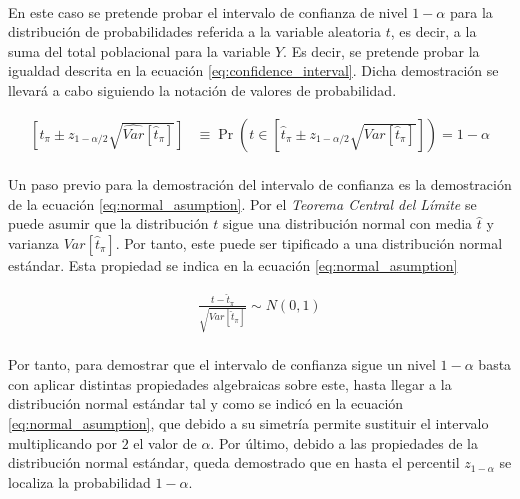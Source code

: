\documentclass{article}
\begin{document}
    \paragraph{}
    En este caso se pretende probar el intervalo de confianza de nivel $1-\alpha$ para la distribución de probabilidades referida a la variable aleatoria $t$, es decir, a la suma del total poblacional para la variable $Y$. Es decir, se pretende probar la igualdad descrita en la ecuación \eqref{eq:confidence_interval}. Dicha demostración se llevará a cabo siguiendo la notación de valores de probabilidad.

    \begin{align}
    \label{eq:confidence_interval}
      \left[\widehat{t}_\pi \pm z_{1-\alpha/2}\sqrt{\widehat{Var}[\widehat{t}_\pi]}\right] &\equiv \Pr\left(t\in \left[\widehat{t}_\pi \pm z_{1-\alpha/2}\sqrt{Var[\widehat{t}_\pi]}\right]\right) = 1-\alpha
    \end{align}

    \paragraph{}
    Un paso previo para la demostración del intervalo de confianza es la demostración de la ecuación \eqref{eq:normal_asumption}. Por el \emph{Teorema Central del Límite} se puede asumir que la distribución $t$ sigue una distribución normal con media $\widehat{t}$ y varianza $Var[\widehat{t}_\pi]$. Por tanto, este puede ser tipificado a una distribución normal estándar. Esta propiedad se indica en la ecuación \eqref{eq:normal_asumption}

    \begin{align}
    \label{eq:normal_asumption}
      \frac{t - \widehat{t}_\pi}{\sqrt{Var[\widehat{t}_\pi]}} \sim N(0,1)
    \end{align}

    \paragraph{}
    Por tanto, para demostrar que el intervalo de confianza sigue un nivel $1-\alpha$ basta con aplicar distintas propiedades algebraicas sobre este, hasta llegar a la distribución normal estándar tal y como se indicó en la ecuación \eqref{eq:normal_asumption}, que debido a su simetría permite sustituir el intervalo multiplicando por $2$ el valor de $\alpha$. Por último, debido a las propiedades de la distribución normal estándar, queda demostrado que en hasta el percentil $z_{1-\alpha}$ se localiza la probabilidad $1-\alpha$. 
\end{document}

